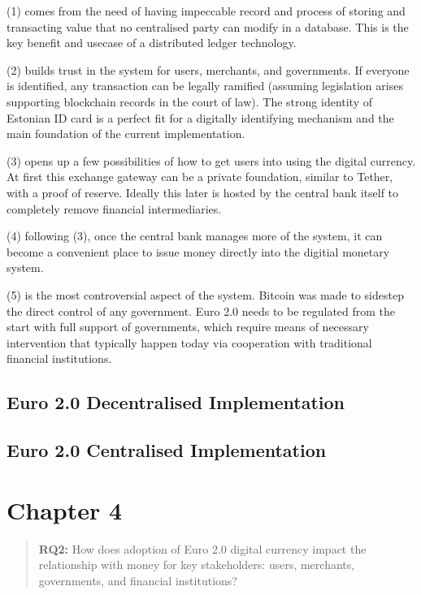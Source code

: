 \documentclass[12pt]{article} %
\begin{document}
{{(1) comes from the need of having impeccable record and process of storing and transacting value that no centralised party can modify in a database. This is the key benefit and usecase of a distributed ledger technology.

(2) builds trust in the system for users, merchants, and governments. If everyone is identified, any transaction can be legally ramified (assuming legislation arises supporting blockchain records in the court of law). The strong identity of Estonian ID card is a perfect fit for a digitally identifying mechanism and the main foundation of the current implementation.

(3) opens up a few possibilities of how to get users into using the digital currency. At first this exchange gateway can be a private foundation, similar to Tether\cite{tether2016whitepaper}, with a proof of reserve. Ideally this later is hosted by the central bank itself to completely remove financial intermediaries.

(4) following (3), once the central bank manages more of the system, it can become a convenient place to issue money directly into the digitial monetary system.

(5) is the most controversial aspect of the system. Bitcoin was made to sidestep the direct control of any government\cite{nakamoto2008bitcoin}. Euro 2.0 needs to be regulated from the start with full support of governments, which require means of necessary intervention that typically happen today via cooperation with traditional financial institutions.

\subsection{Euro 2.0 Decentralised Implementation} \label{ssec:3.4}

\subsection{Euro 2.0 Centralised Implementation} \label{ssec:3.5}

\pagebreak

\section{Chapter 4} \label{sec:4}


\begin{quotation}
	\textbf{RQ2:} How does adoption of Euro 2.0 digital currency impact the relationship with money for key stakeholders: users, merchants, governments, and financial institutions?
\end{quotation}

}}
\end{document}
